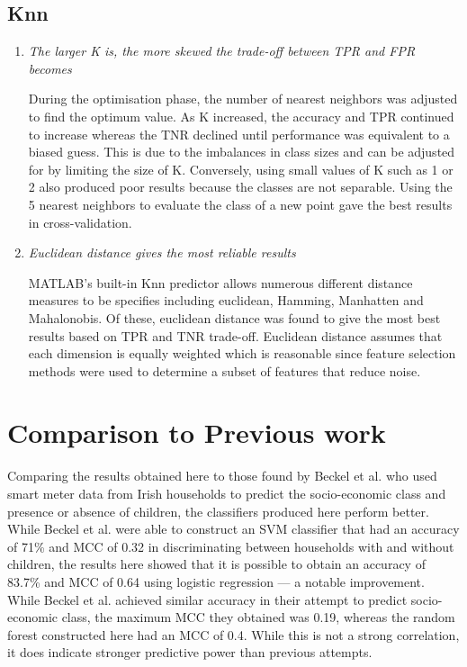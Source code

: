 \subsection{Knn}

\begin{enumerate}

\item \textit{The larger K is, the more skewed the trade-off between TPR and FPR becomes}

During the optimisation phase, the number of nearest neighbors was adjusted to find the optimum value. As K increased, the accuracy and TPR continued to increase whereas the TNR declined until performance was equivalent to a biased guess. This is due to the imbalances in class sizes and can be adjusted for by limiting the size of K. Conversely, using small values of K such as 1 or 2 also produced poor results because the classes are not separable. Using the 5 nearest neighbors to evaluate the class of a new point gave the best results in cross-validation.

\item \textit{Euclidean distance gives the most reliable results}

MATLAB's built-in Knn predictor allows numerous different distance measures to be specifies including euclidean, Hamming, Manhatten and Mahalonobis. Of these, euclidean distance was found to give the most best results based on TPR and TNR trade-off. Euclidean distance assumes that each dimension is equally weighted which is reasonable since feature selection methods were used to determine a subset of features that reduce noise.
\end{enumerate}


\section{Comparison to Previous work}

Comparing the results obtained here to those found by Beckel et al. \cite{Beckel_1, Beckel_2, Beckel_3} who used smart meter data from Irish households to predict the socio-economic class and presence or absence of children, the classifiers produced here perform better. While Beckel et al. were able to construct an SVM classifier that had an accuracy of 71\% and MCC of 0.32 in discriminating between households with and without children, the results here showed that it is possible to obtain an accuracy of 83.7\% and MCC of 0.64 using logistic regression --- a notable improvement. While Beckel et al. achieved similar accuracy in their attempt to predict socio-economic class, the maximum MCC they obtained was 0.19, whereas the random forest constructed here had an MCC of 0.4. While this is not a strong correlation, it does indicate stronger predictive power than previous attempts.


